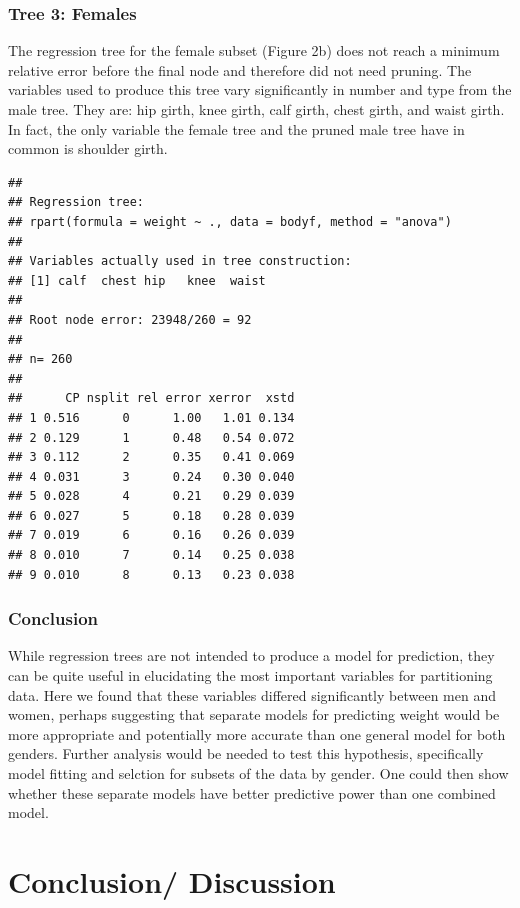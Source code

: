 \documentclass[11pt]{article}\usepackage[]{graphicx}\usepackage[]{color}
\makeatletter
\newenvironment{kframe}{%
 \def\at@end@of@kframe{}%
 \ifinner\ifhmode%
  \def\at@end@of@kframe{\end{minipage}}%
  \begin{minipage}{\columnwidth}%
 \fi\fi%
 \def\FrameCommand##1{\hskip\@totalleftmargin \hskip-\fboxsep
 \colorbox{shadecolor}{##1}\hskip-\fboxsep
     \hskip-\linewidth \hskip-\@totalleftmargin \hskip\columnwidth}%
 \MakeFramed {\advance\hsize-\width
   \@totalleftmargin\z@ \linewidth\hsize
   \@setminipage}}%
 {\par\unskip\endMakeFramed%
 \at@end@of@kframe}
\newenvironment{knitrout}{}{} %
\makeatother
\begin{document}
\subsubsection{Tree 3: Females} 
The regression tree for the female subset (Figure 2b) does not reach a minimum relative error before the final node and therefore did not need pruning. The variables used to produce this tree vary significantly in number and type from the male tree. They are: hip girth, knee girth, calf girth, chest girth, and waist girth. In fact, the only variable the female tree and the pruned male tree have in common is shoulder girth.

\begin{knitrout}
\color{fgcolor}\begin{kframe}
\begin{verbatim}
## 
## Regression tree:
## rpart(formula = weight ~ ., data = bodyf, method = "anova")
## 
## Variables actually used in tree construction:
## [1] calf  chest hip   knee  waist
## 
## Root node error: 23948/260 = 92
## 
## n= 260 
## 
##      CP nsplit rel error xerror  xstd
## 1 0.516      0      1.00   1.01 0.134
## 2 0.129      1      0.48   0.54 0.072
## 3 0.112      2      0.35   0.41 0.069
## 4 0.031      3      0.24   0.30 0.040
## 5 0.028      4      0.21   0.29 0.039
## 6 0.027      5      0.18   0.28 0.039
## 7 0.019      6      0.16   0.26 0.039
## 8 0.010      7      0.14   0.25 0.038
## 9 0.010      8      0.13   0.23 0.038
\end{verbatim}
\end{kframe}
\end{knitrout}


\subsubsection{Conclusion}
While regression trees are not intended to produce a model for prediction, they can be quite useful in elucidating the most important variables for partitioning data. Here we found that these variables differed significantly between men and women, perhaps suggesting that separate models for predicting weight would be more appropriate and potentially more accurate than one general model for both genders. Further analysis would be needed to test this hypothesis, specifically model fitting and selction for subsets of the data by gender. One could then show whether these separate models have better predictive power than one combined model.


\newpage

\section{Conclusion/ Discussion}
\end{document}
